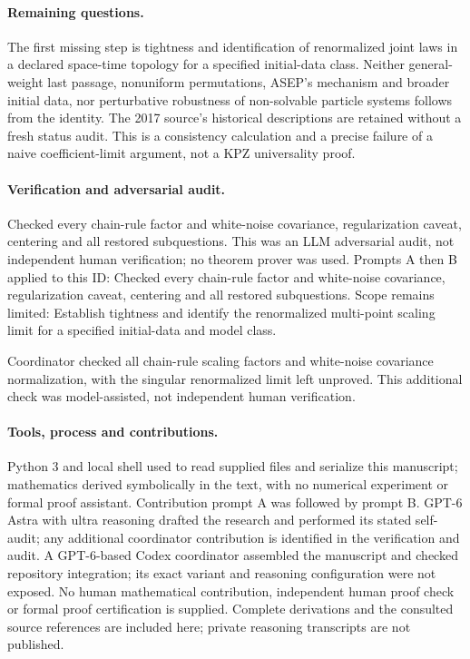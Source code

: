\documentclass[11pt]{article}
\begin{document}
\paragraph{Remaining questions.}The first missing step is tightness and identification of renormalized joint laws in a declared space-time topology for a specified initial-data class. Neither general-weight last passage, nonuniform permutations, ASEP's mechanism and broader initial data, nor perturbative robustness of non-solvable particle systems follows from the identity. The 2017 source's historical descriptions are retained without a fresh status audit. This is a consistency calculation and a precise failure of a naive coefficient-limit argument, not a KPZ universality proof.

\paragraph{Verification and adversarial audit.}
Checked every chain-rule factor and white-noise covariance, regularization caveat, centering and all restored subquestions. This was an LLM adversarial audit, not independent human verification; no theorem prover was used. Prompts A then B applied to this ID: Checked every chain-rule factor and white-noise covariance, regularization caveat, centering and all restored subquestions. Scope remains limited: Establish tightness and identify the renormalized multi-point scaling limit for a specified initial-data and model class.

Coordinator checked all chain-rule scaling factors and white-noise covariance normalization, with the singular renormalized limit left unproved. This additional check was model-assisted, not independent human verification.

\paragraph{Tools, process and contributions.}
Python 3 and local shell used to read supplied files and serialize this manuscript; mathematics derived symbolically in the text, with no numerical experiment or formal proof assistant. Contribution prompt A was followed by prompt B. GPT-6 Astra with ultra reasoning drafted the research and performed its stated self-audit; any additional coordinator contribution is identified in the verification and audit. A GPT-6-based Codex coordinator assembled the manuscript and checked repository integration; its exact variant and reasoning configuration were not exposed. No human mathematical contribution, independent human proof check or formal proof certification is supplied. Complete derivations and the consulted source references are included here; private reasoning transcripts are not published.
\end{document}
